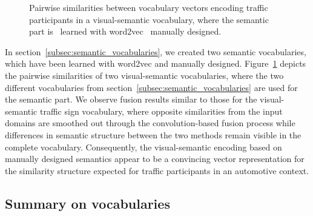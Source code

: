 \begin{figure}[t]
    \centering
    \caption{Pairwise similarities between vocabulary vectors encoding traffic participants in a visual-semantic vocabulary, where the semantic part is~\protect{} learned with word2vec~\protect{} manually designed.}
    \label{fig:visual_semantic_vocab_traffic_participants_internal_similarities}
\end{figure}

In section~\ref{subsec:semantic_vocabularies}, we created two semantic vocabularies, which have been learned with word2vec and manually designed.
Figure~\ref{fig:visual_semantic_vocab_traffic_participants_internal_similarities} depicts the pairwise similarities of two visual-semantic vocabularies, where the two different vocabularies from section~\ref{subsec:semantic_vocabularies} are used for the semantic part.
We observe fusion results similar to those for the visual-semantic traffic sign vocabulary, where opposite similarities from the input domains are smoothed out through the convolution-based fusion process while differences in semantic structure between the two methods remain visible in the complete vocabulary.
Consequently, the visual-semantic encoding based on manually designed semantics appear to be a convincing vector representation for the similarity structure expected for traffic participants in an automotive context.

\subsection{Summary on vocabularies}%
\label{subsec:summary_on_vocabularies}

